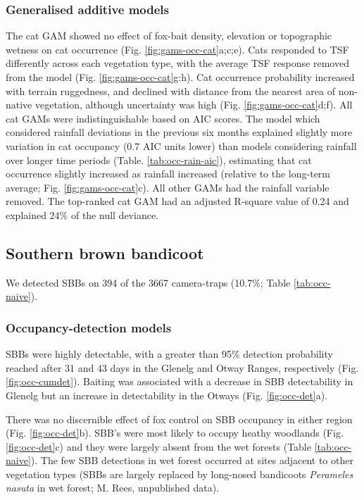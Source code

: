 \documentclass[11pt,a4paper,titlepage,twoside,openright]{style/unimelbthesis}
\begin{document}
\begin{mainmatter}
\hypertarget{generalised-additive-models-2}{%
\subsubsection{Generalised additive models}\label{generalised-additive-models-2}}

The cat GAM showed no effect of fox-bait density, elevation or topographic wetness on cat occurrence (Fig. \ref{fig:gams-occ-cat}a;c;e). Cats responded to TSF differently across each vegetation type, with the average TSF response removed from the model (Fig. \ref{fig:gams-occ-cat}g:h). Cat occurrence probability increased with terrain ruggedness, and declined with distance from the nearest area of non-native vegetation, although uncertainty was high (Fig. \ref{fig:gams-occ-cat}d;f). All cat GAMs were indistinguishable based on AIC scores. The model which considered rainfall deviations in the previous six months explained slightly more variation in cat occupancy (0.7 AIC units lower) than models considering rainfall over longer time periods (Table. \ref{tab:occ-rain-aic}), estimating that cat occurrence slightly increased as rainfall increased (relative to the long-term average; Fig. \ref{fig:gams-occ-cat}c). All other GAMs had the rainfall variable removed. The top-ranked cat GAM had an adjusted R-square value of 0.24 and explained 24\% of the null deviance.

\hypertarget{southern-brown-bandicoot-1}{%
\subsection{Southern brown bandicoot}\label{southern-brown-bandicoot-1}}

We detected SBBs on 394 of the 3667 camera-traps (10.7\%; Table \ref{tab:occ-naive}).

\hypertarget{occupancy-detection-models-3}{%
\subsubsection{Occupancy-detection models}\label{occupancy-detection-models-3}}

SBBs were highly detectable, with a greater than 95\% detection probability reached after 31 and 43 days in the Glenelg and Otway Ranges, respectively (Fig. \ref{fig:occ-cumdet}). Baiting was associated with a decrease in SBB detectability in Glenelg but an increase in detectability in the Otways (Fig. \ref{fig:occ-det}a).

There was no discernible effect of fox control on SBB occupancy in either region (Fig. \ref{fig:occ-det}b). SBB's were most likely to occupy heathy woodlands (Fig. \ref{fig:occ-det}c) and they were largely absent from the wet forests (Table \ref{tab:occ-naive}). The few SBB detections in wet forest occurred at sites adjacent to other vegetation types (SBBs are largely replaced by long-nosed bandicoots \emph{Perameles nasuta} in wet forest; M. Rees, unpublished data).


\end{mainmatter}
\end{document}
